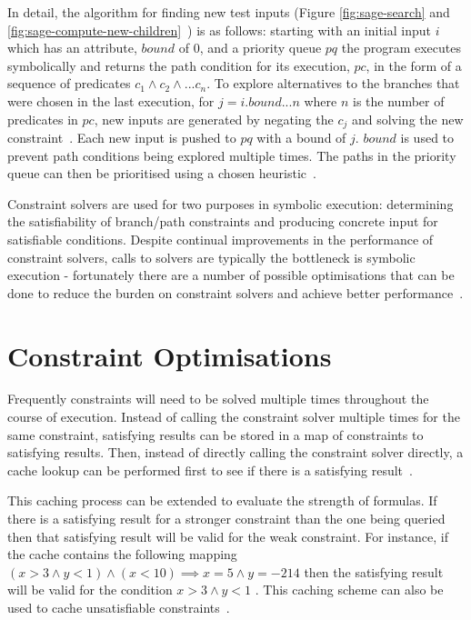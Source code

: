 \documentclass[]{final_report}
\begin{document}
In detail, the algorithm for finding new test inputs (Figure \ref{fig:sage-search} and \ref{fig:sage-compute-new-children}~\cite{godefroid2008automated}) is as follows: starting with an initial input $i$ which has an attribute, $bound$ of 0, and a priority queue $pq$ the program executes symbolically and returns the path condition for its execution, $pc$, in the form of a sequence of predicates $c_1 \land c_2 \land ... c_n $. To explore alternatives to the branches that were chosen in the last execution, for $j = i.bound ... n$ where $n$ is the number of predicates in $pc$, new inputs are generated by negating the $c_j$ and solving the new constraint~\cite{godefroid2005dart, godefroid2008grammar}. Each new input is pushed to $pq$ with a bound of $j$. $bound$ is used to prevent path conditions being explored multiple times. The paths in the priority queue can then be prioritised using a chosen heuristic~\cite{cadar2013symbolic}. 

Constraint solvers are used for two purposes in symbolic execution: determining the satisfiability of branch/path constraints and producing concrete input for satisfiable conditions. Despite continual improvements in the performance of constraint solvers, calls to solvers are typically the bottleneck is symbolic execution - fortunately there are a number of possible optimisations that can be done to reduce the burden on constraint solvers and achieve better performance~\cite{cadar2013symbolic}.

\section{Constraint Optimisations}
Frequently constraints will need to be solved multiple times throughout the course of execution. Instead of calling the constraint solver multiple times for the same constraint, satisfying results can be stored in a map of constraints to satisfying results. Then, instead of directly calling the constraint solver directly, a cache lookup can be performed first to see if there is a satisfying result~\cite{cadar2008klee}.

This caching process can be extended to evaluate the strength of formulas. If there is a satisfying result for a stronger constraint than the one being queried then that satisfying result will be valid for the weak constraint. For instance, if the cache contains the following mapping $ (x > 3 \land y <1) \land (x < 10) \implies x = 5 \land y = -214$ then the satisfying result will be valid for the condition $x > 3 \land y < 1 $ . This caching scheme can also be used to cache unsatisfiable constraints~\cite{cadar2008klee}.
\end{document}

